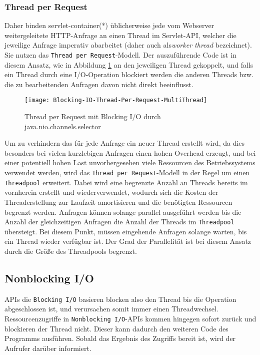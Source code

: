 \subsubsection{Thread per Request}
\label{subsubsec:thread per request}
Daher binden \Gls{servlet-container}(*) üblicherweise jede vom Webserver weitergeleitete HTTP-Anfrage an einen
Thread im Servlet-API, welcher die jeweilige Anfrage imperativ abarbeitet
(daher auch als\textit{worker thread} bezeichnet). Sie nutzen das \verb|Thread per Request|-Modell.
Der auszuführende Code ist in diesem Ansatz, wie in Abbildung \ref{fig:blocking_thread_per_request}
an den jeweiligen Thread gekoppelt, und falls ein Thread durch eine I/O-Operation blockiert werden
die anderen Threads bzw. die zu bearbeitenden Anfragen davon nicht direkt beeinflusst.
\begin{figure}[ht!]
  \centering
  \texttt{[image: Blocking-IO-Thread-Per-Request-MultiThread]}
  \caption{Thread per Request mit Blocking I/O durch java.nio.channels.selector \parencite{NettyInAction}}
  \label{fig:blocking_thread_per_request}
\end{figure}

Um zu verhindern das für jede Anfrage ein neuer Thread erstellt wird, da dies besonders bei vielen kurzlebigen
Anfragen einen hohen Overhead erzeugt, und bei einer potentiell hohen Last
unvorhergesehen viele Ressourcen des Betriebssystems verwendet werden, wird das \verb|Thread per Request|-Modell
in der Regel um einen \verb|Threadpool| erweitert.
Dabei wird eine begrenzte Anzahl an Threads bereits im vornherein erstellt und wiederverwendet, wodurch sich die Kosten der Threaderstellung
zur Laufzeit amortisieren und die benötigten Ressourcen begrenzt werden.
Anfragen können solange parallel ausgeführt werden bis die Anzahl der gleichzeitigen Anfragen die
Anzahl der Threads im \verb|Threadpool| übersteigt.
Bei diesem Punkt, müssen eingehende Anfragen solange warten, bis ein Thread wieder verfügbar ist.
Der Grad der Parallelität ist bei diesem Ansatz durch die Größe des Threadpools begrenzt.
\newpage
\subsection{Nonblocking I/O}
\label{subsec:nonblocking-i/o}
APIs die \verb|Blocking I/O| basieren blocken also den Thread bis die Operation abgeschlossen ist, und verursachen somit
immer einen Threadwechsel.
Ressourcenzugriffe in \verb|Nonblocking I/O|-APIs kommen hingegen sofort zurück und blockieren der Thread nicht.
Dieser kann dadurch den weiteren Code des Programms ausführen.
Sobald das Ergebnis des Zugriffs bereit ist, wird der Aufrufer darüber informiert.

